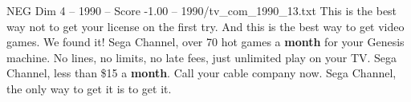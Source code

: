 \begin{textsample}{NEG Dim 4 – 1990 – Score -1.00 – 1990/tv\_com\_1990\_13.txt}  \label{ex:f4_neg_080}
This is the best way not to get your license on the first try.
And this is the best way to get video games.
We found it!
Sega Channel, over 70 hot games a \textbf{month} for your Genesis machine.
No lines, no limits, no late fees, just unlimited play on your TV.
Sega Channel, less than \$15 a \textbf{month}.
Call your cable company now.
Sega Channel, the only way to get it is to get it.

\end{textsample}
